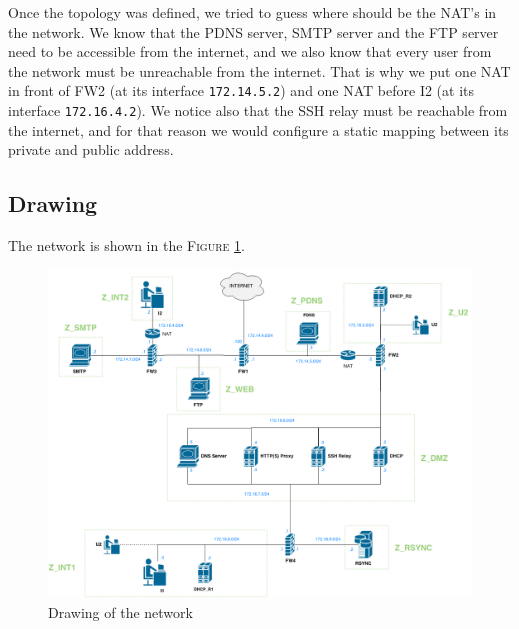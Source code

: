 \documentclass[a4paper,titlepage]{article}
\begin{document}
Once the topology was defined, we tried to guess where should be the NAT's in the network. We know that the  PDNS server, SMTP server and the FTP server need to be accessible from the internet, and we also know that every user from the network must be unreachable from the internet. That is why we put one NAT in front of FW2 (at its interface \texttt{172.14.5.2}) and one NAT before I2 (at its interface \texttt{172.16.4.2}). We notice also that the SSH relay must be reachable from the internet, and for that reason we would configure a static mapping between its private and public address.


\subsection{Drawing}

The network is shown in the \textsc{Figure} \ref{draw}.

\begin{landscape}
	\begin{figure}
		\centering
		\includegraphics[scale=0.47]{ICS-Draw.png}
		\caption{Drawing of the network}
		\label{draw}
	\end{figure}

\end{landscape}
	
\end{document}
